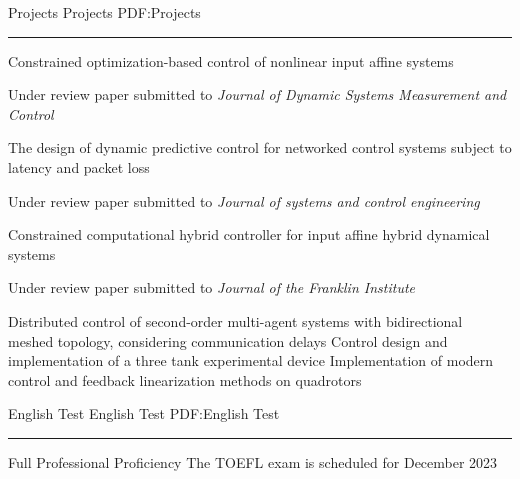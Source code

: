 \documentclass[letterpaper,MMMyyyy]{CVTemplate}
\begin{document}
\begin{Body}
\Section
{Projects}
{Projects}
{PDF:Projects}
\textcolor{Forestg}{\vspace{0.10cm}\hrule height 0.1cm}\BigGap\Gap
\vspace{6pt}
\BulletItem
Constrained optimization-based control of nonlinear input affine systems 
\begin{Detail}
	\SubBulletItem Under review paper submitted to \textit{Journal of Dynamic Systems Measurement and Control}
\end{Detail}
\vspace{6pt}
\BulletItem
The design of dynamic predictive control for networked control systems subject to latency and packet loss
\begin{Detail}
	\SubBulletItem Under review paper submitted to \textit{Journal of systems and control engineering}
\end{Detail}
\vspace{6pt}
\BulletItem
Constrained computational hybrid controller for input affine hybrid dynamical systems
\begin{Detail}
	\SubBulletItem Under review paper submitted to \textit{Journal of the Franklin Institute}
\end{Detail}
\vspace{6pt}
\BulletItem
Distributed control of second-order multi-agent systems with bidirectional meshed topology, considering communication delays
\vspace{6pt}
\BulletItem
Control design and implementation of a three tank experimental device
\vspace{6pt}
\BulletItem
Implementation of modern control and feedback linearization methods on quadrotors

\Section
{English Test}
{English Test}
{PDF:English Test}
\textcolor{Forestg}{\vspace{0.10cm}\hrule height 0.1cm}\BigGap\Gap
\BulletItem
Full Professional Proficiency 
\newline
The TOEFL exam is scheduled for December 2023



\end{Body}
\end{document}
